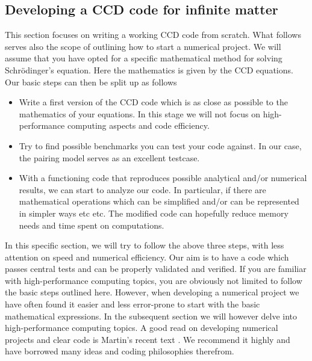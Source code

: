 \subsection{Developing a CCD code for infinite matter}
  This section focuses on writing a working CCD code from
  scratch. What follows serves also the scope of outlining how to start a numerical project.  We will assume that you have 
opted for a specific mathematical method for solving Schr\"odinger's equation. Here the mathematics is  given by the CCD equations.  
Our basic steps can then be split up as follows 
  \begin{itemize}
\item Write a first version of the CCD  code which is as close as possible to the mathematics of your equations. In this stage we will not 
focus on high-performance computing aspects and code efficiency.
\item Try to find possible benchmarks you can test your code against. In our case, the pairing model serves as an excellent testcase. 
\item With a functioning code that reproduces possible analytical and/or numerical results, we can start to analyze our code. In particular, if there are mathematical operations which can be simplified and/or can be represented in simpler ways etc etc. The modified code can hopefully reduce memory needs and time spent on computations.
\end{itemize}
In this specific section, we will try to follow the above three steps,
with less attention on speed and numerical efficiency.  Our aim is to
have a code which passes central tests and can be properly validated
and verified.  If you are familiar with high-performance computing
topics, you are obviously not limited to follow the basic steps
outlined here.  However, when developing a numerical project we have
often found it easier and less error-prone to start with the basic
mathematical expressions. In the subsequent section we will however
delve into high-performance computing topics. A good read on developing numerical projects and clear code is Martin's recent text \cite{martin2015}.
We recommend it highly and have borrowed many ideas and coding philosophies therefrom. 

